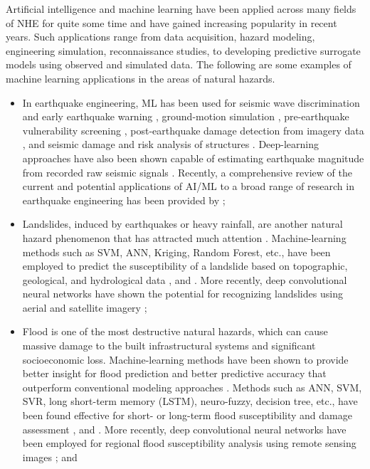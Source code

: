 Artificial intelligence and machine learning  have been applied across many fields of NHE for quite some time and have gained increasing popularity in recent years. Such applications range from data acquisition, hazard modeling, engineering simulation, reconnaissance studies, to developing predictive surrogate models using observed and simulated data. The following are some examples of machine learning applications in the areas of natural hazards.

\begin{itemize}
 \item In earthquake engineering, ML has been used for seismic wave discrimination and early earthquake warning \citep{li2018machine}, ground-motion simulation \citep{alimoradi2015machinelearning}, pre-earthquake vulnerability screening \citep{yu2019building}, post-earthquake damage detection from imagery data \citep{cooner2016detection,bai2017machine}, and seismic damage and risk analysis of structures \citep{gidaris2015kriging}. Deep-learning approaches have also been shown capable of estimating earthquake magnitude from recorded raw seismic signals \citep{mousavi2020machine}. Recently, a comprehensive review of the current and potential applications of AI/ML to a broad range of research in earthquake engineering has been provided by \citet{xie2020promise};
     \vspace{2mm}
 \item Landslides, induced by earthquakes or heavy rainfall, are another natural hazard phenomenon that has attracted much attention \citep{dou2014gisbased}. Machine-learning methods such as SVM, ANN, Kriging, Random Forest, etc., have been employed to predict the susceptibility of a landslide based on topographic, geological, and hydrological data \citep{yao2008landslide,goetz2015evaluating}, and \citep{pham2016comparative}. More recently, deep convolutional neural networks have shown the potential for recognizing landslides using aerial and satellite imagery \citep{ghorbanzadeh2019evaluation};
     \vspace{2mm}
 \item Flood is one of the most destructive natural hazards, which can cause massive damage to the built infrastructural systems and significant socioeconomic loss. Machine-learning methods have been shown to provide better insight for flood prediction and better predictive accuracy that outperform conventional modeling approaches \citep{abbot2014input,mosavi2018flood}. Methods such as ANN, SVM, SVR, long short-term memory (LSTM), neuro-fuzzy, decision tree, etc., have been found effective for short- or long-term flood susceptibility and damage assessment \citep{kim2016realtime,gizaw2016regional,resch2018combining,darabi2019urban}, and \citep{le2019application}. More recently, deep convolutional neural networks have been employed for regional flood susceptibility analysis using remote sensing images \citep{gebrehiwot2019deep,li2019urban,wang2020flood}; and

\end{itemize}

